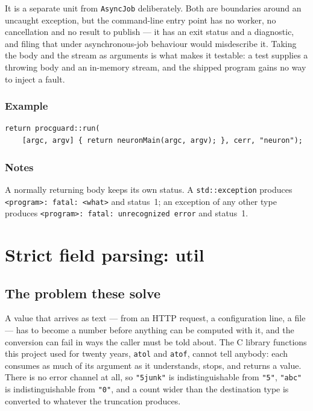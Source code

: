 It is a separate unit from \texttt{AsyncJob} deliberately.  Both are boundaries
around an uncaught exception, but the command-line entry point has no worker, no
cancellation and no result to publish --- it has an exit status and a
diagnostic, and filing that under asynchronous-job behaviour would misdescribe
it.  Taking the body and the stream as arguments is what makes it testable: a
test supplies a throwing body and an in-memory stream, and the shipped program
gains no way to inject a fault.

\subsubsection{Example}
\begin{verbatim}
return procguard::run(
    [argc, argv] { return neuronMain(argc, argv); }, cerr, "neuron");
\end{verbatim}

\subsubsection{Notes}
A normally returning body keeps its own status.  A \texttt{std::exception}
produces \texttt{<program>: fatal: <what>} and status~1; an exception of any
other type produces \texttt{<program>: fatal: unrecognized error} and status~1.

\section{Strict field parsing: util}\label{sec:util-strict-parsing}

\subsection{The problem these solve}

A value that arrives as text --- from an HTTP request, a configuration line,
a file --- has to become a number before anything can be computed with it,
and the conversion can fail in ways the caller must be told about.  The C
library functions this project used for twenty years,
\texttt{atol} and \texttt{atof}, cannot tell anybody: each consumes as much of
its argument as it understands, stops, and returns a value.  There is no error
channel at all, so \texttt{"5junk"} is indistinguishable from \texttt{"5"},
\texttt{"abc"} is indistinguishable from \texttt{"0"}, and a count wider than
the destination type is converted to whatever the truncation produces.

